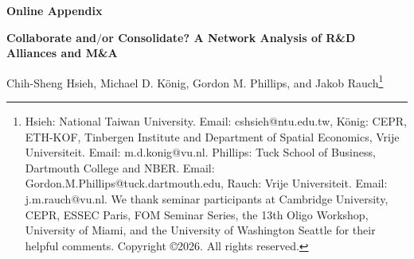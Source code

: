 \appendix

\begin{center}

\textbf{\Large Online Appendix}

\vspace{0.5cm}

\textbf{\Large  Collaborate and$/$or Consolidate? A Network Analysis of R\&D Alliances and M\&A}

\vspace{0.5cm}

Chih-Sheng Hsieh, Michael D. K{\"o}nig, Gordon M. Phillips, and Jakob Rauch\footnote{Hsieh: National Taiwan University. Email: cshsieh@ntu.edu.tw, K{\"o}nig:  CEPR, ETH-KOF, Tinbergen Institute and Department of Spatial Economics, Vrije Universiteit. Email: m.d.konig@vu.nl. Phillips: Tuck School of Business, Dartmouth College and NBER. Email: Gordon.M.Phillips@tuck.dartmouth.edu, Rauch: Vrije Universiteit. Email: j.m.rauch@vu.nl. We thank seminar participants at Cambridge University, CEPR, ESSEC Paris, FOM Seminar Series, the 13th Oligo Workshop, University of Miami, and the University of Washington Seattle for their helpful comments. Copyright \copyright 2026.  All rights reserved.}

\end{center}

\setcounter{section}{3}
\setcounter{page}{1}
{}

\appendixwithtoc
\clearpage

